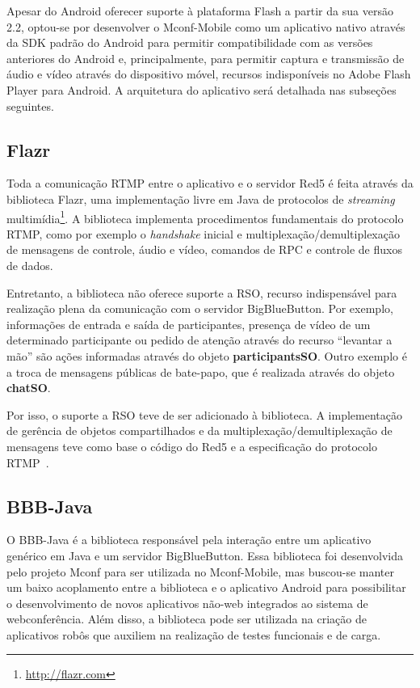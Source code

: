 \documentclass{acm_proc_article-sp}
\begin{document}
Apesar do Android oferecer suporte à plataforma Flash a partir da sua versão 2.2, optou-se por desenvolver o Mconf-Mobile como um aplicativo nativo através da SDK padrão do Android para permitir compatibilidade com as versões anteriores do Android e, principalmente, para permitir captura e transmissão de áudio e vídeo através do dispositivo móvel, recursos indisponíveis no Adobe Flash Player para Android. A arquitetura do aplicativo será detalhada nas subseções seguintes.

\subsection{Flazr}

Toda a comunicação RTMP entre o aplicativo e o servidor Red5 é feita através da biblioteca Flazr, uma implementação livre em Java de protocolos de \emph{streaming} multimídia\footnote{\url{http://flazr.com}}. A biblioteca implementa procedimentos fundamentais do protocolo RTMP, como por exemplo o \emph{handshake} inicial e multiplexação/demultiplexação de mensagens de controle, áudio e vídeo, comandos de RPC e controle de fluxos de dados.

Entretanto, a biblioteca não oferece suporte a RSO, recurso indispensável para realização plena da comunicação com o servidor BigBlueButton. Por exemplo, informações de entrada e saída de participantes, presença de vídeo de um determinado participante ou pedido de atenção através do recurso ``levantar a mão'' são ações informadas através do objeto \textbf{participantsSO}. Outro exemplo é a troca de mensagens públicas de bate-papo, que é realizada através do objeto \textbf{chatSO}. 

Por isso, o suporte a RSO teve de ser adicionado à biblioteca. A implementação de gerência de objetos compartilhados e da multiplexação/demultiplexação de mensagens teve como base o código do Red5 e a especificação do protocolo RTMP~\cite{rtmp}.

\subsection{BBB-Java}

O BBB-Java é a biblioteca responsável pela interação entre um aplicativo genérico em Java e um servidor BigBlueButton. Essa biblioteca foi desenvolvida pelo projeto Mconf para ser utilizada no Mconf-Mobile, mas buscou-se manter um baixo acoplamento entre a biblioteca e o aplicativo Android para possibilitar o desenvolvimento de novos aplicativos não-web integrados ao sistema de webconferência. Além disso, a biblioteca pode ser utilizada na criação de aplicativos robôs que auxiliem na realização de testes funcionais e de carga.
\end{document}
